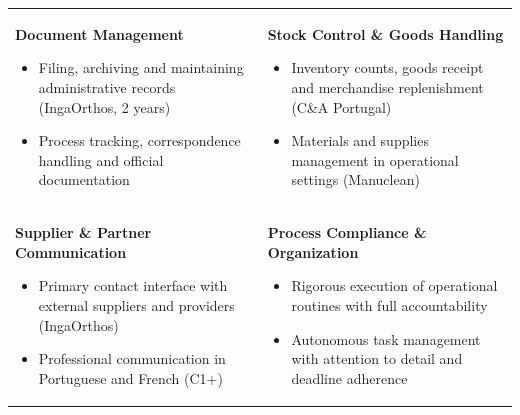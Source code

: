 \documentclass[10pt,a4paper]{article}
\begin{document}
\begin{tabularx}{\textwidth}{@{}XX@{}}

\begin{minipage}[t]{\linewidth}
  {\small\bfseries\color{accent}Document Management}
  \begin{itemize}\small
    \item Filing, archiving and maintaining administrative records (IngaOrthos, 2 years)
    \item Process tracking, correspondence handling and official documentation
  \end{itemize}
\end{minipage}
&
\begin{minipage}[t]{\linewidth}
  {\small\bfseries\color{accent}Stock Control \& Goods Handling}
  \begin{itemize}\small
    \item Inventory counts, goods receipt and merchandise replenishment (C\&A Portugal)
    \item Materials and supplies management in operational settings (Manuclean)
  \end{itemize}
\end{minipage}
\\[8pt]

\begin{minipage}[t]{\linewidth}
  {\small\bfseries\color{accent}Supplier \& Partner Communication}
  \begin{itemize}\small
    \item Primary contact interface with external suppliers and providers (IngaOrthos)
    \item Professional communication in Portuguese and French (C1+)
  \end{itemize}
\end{minipage}
&
\begin{minipage}[t]{\linewidth}
  {\small\bfseries\color{accent}Process Compliance \& Organization}
  \begin{itemize}\small
    \item Rigorous execution of operational routines with full accountability
    \item Autonomous task management with attention to detail and deadline adherence
  \end{itemize}
\end{minipage}

\end{tabularx}

\end{document}
